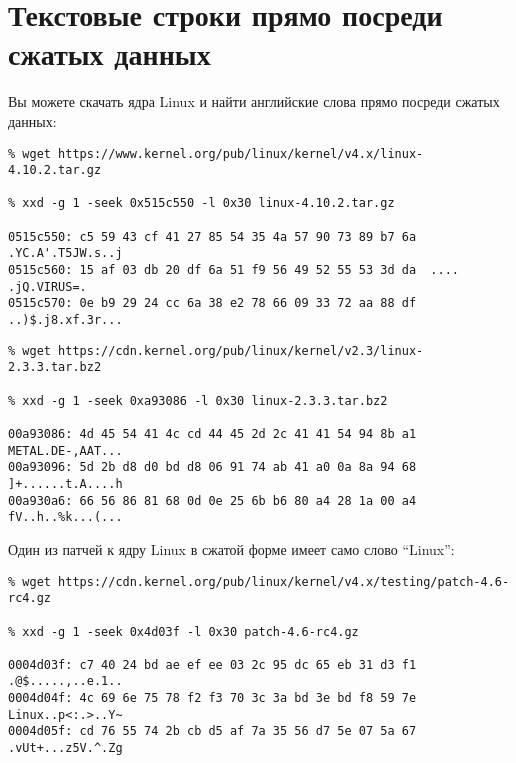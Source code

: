 \section{Текстовые строки прямо посреди сжатых данных}

Вы можете скачать ядра Linux и найти английские слова прямо посреди сжатых данных:

\begin{lstlisting}
% wget https://www.kernel.org/pub/linux/kernel/v4.x/linux-4.10.2.tar.gz

% xxd -g 1 -seek 0x515c550 -l 0x30 linux-4.10.2.tar.gz

0515c550: c5 59 43 cf 41 27 85 54 35 4a 57 90 73 89 b7 6a  .YC.A'.T5JW.s..j
0515c560: 15 af 03 db 20 df 6a 51 f9 56 49 52 55 53 3d da  .... .jQ.VIRUS=.
0515c570: 0e b9 29 24 cc 6a 38 e2 78 66 09 33 72 aa 88 df  ..)$.j8.xf.3r...
\end{lstlisting}

\begin{lstlisting}
% wget https://cdn.kernel.org/pub/linux/kernel/v2.3/linux-2.3.3.tar.bz2

% xxd -g 1 -seek 0xa93086 -l 0x30 linux-2.3.3.tar.bz2

00a93086: 4d 45 54 41 4c cd 44 45 2d 2c 41 41 54 94 8b a1  METAL.DE-,AAT...
00a93096: 5d 2b d8 d0 bd d8 06 91 74 ab 41 a0 0a 8a 94 68  ]+......t.A....h
00a930a6: 66 56 86 81 68 0d 0e 25 6b b6 80 a4 28 1a 00 a4  fV..h..%k...(...
\end{lstlisting}

\iffalse
Можно найти даже имена:

\begin{lstlisting}
% wget https://www.kernel.org/pub/linux/kernel/v2.6/linux-2.6.13.1.tar.bz2

% xxd -g 1 -seek 0x3dfbed -l 0x30 linux-2.6.13.1.tar.bz2

003dfbed: 24 88 a0 cc 5c 60 30 c2 46 28 a9 87 1b 13 30 6c  $...\`0.F(....0l
003dfbfd: 41 4c 49 43 45 14 2c 42 a5 2c ae 82 bf 98 e0 68  ALICE.,B.,.....h
003dfc0d: a4 19 41 26 81 94 20 3b d5 78 8e 89 d3 d0 1c a0  ..A&.. ;.x......
\end{lstlisting}
\fi

Один из патчей к ядру Linux в сжатой форме имеет само слово ``Linux'':

\begin{lstlisting}
% wget https://cdn.kernel.org/pub/linux/kernel/v4.x/testing/patch-4.6-rc4.gz

% xxd -g 1 -seek 0x4d03f -l 0x30 patch-4.6-rc4.gz

0004d03f: c7 40 24 bd ae ef ee 03 2c 95 dc 65 eb 31 d3 f1  .@$.....,..e.1..
0004d04f: 4c 69 6e 75 78 f2 f3 70 3c 3a bd 3e bd f8 59 7e  Linux..p<:.>..Y~
0004d05f: cd 76 55 74 2b cb d5 af 7a 35 56 d7 5e 07 5a 67  .vUt+...z5V.^.Zg
\end{lstlisting}

